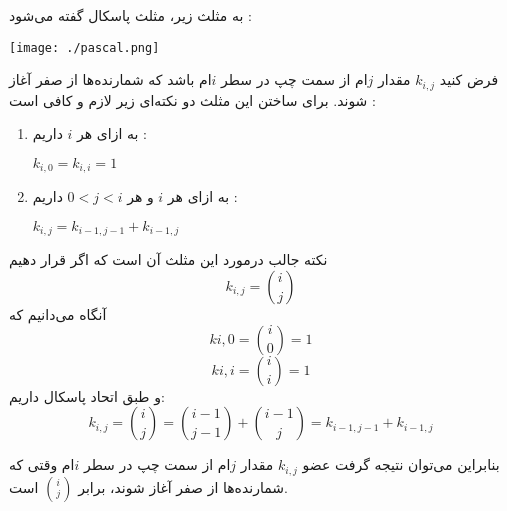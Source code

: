 \p
به مثلث زیر، مثلث پاسکال گفته می‌شود :

\begin{center}
  \texttt{[image: ./pascal.png]}
\end{center}
\p
فرض کنید
$k_{i,j}$
مقدار 
$j$ام
از سمت چپ در سطر
$i$ام
باشد که شمارنده‌ها از صفر آغاز شوند. برای ساختن این مثلث دو نکته‌ای زیر لازم و کافی است :
\begin{enumerate}
  \item 
  به ازای هر
  $i$
  داریم :
  \begin{center}
    $k_{i,0} = k_{i,i} = 1$
  \end{center}

  \item 
  به ازای هر 
  $i$ و هر
  $0 < j < i$
  داریم :
  \begin{center}
    $k_{i,j} = k_{i-1,j-1} + k_{i-1,j}$
  \end{center}
\end{enumerate}
\p
نکته جالب درمورد این مثلث آن است که اگر قرار دهیم
$$k_{i,j} = {i \choose j}$$
آنگاه می‌دانیم که
$$k{i,0} = {i \choose 0} = 1$$
$$k{i,i} = {i \choose i} = 1$$
و طبق اتحاد پاسکال داریم:
$$k_{i,j} = {i \choose j} = {i-1 \choose j-1} + {i-1 \choose j} = k_{i-1,j-1} + k_{i-1,j}$$

بنابراین می‌توان نتیجه گرفت عضو
$k_{i,j}$
مقدار 
$j$ام
از سمت چپ در سطر
$i$ام
وقتی که شمارنده‌ها از صفر آغاز شوند، برابر 
$i \choose j$
است.